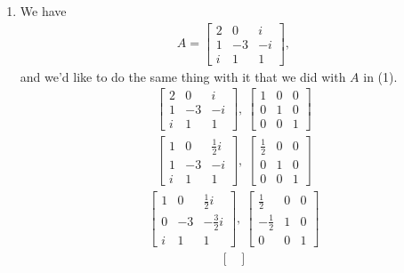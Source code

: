 \documentclass[12pt]{article}
\begin{document}
\begin{enumerate}
  \item
    We have
    \begin{align*}
      A =
      \begin{bmatrix}
        2 & 0 & i\\
        1 & -3 & -i\\
        i & 1 & 1
      \end{bmatrix},
    \end{align*}
    and we'd like to do the same thing with it that we did with
    $A$ in (1).
    \begin{align*}
      \begin{bmatrix}
        2 & 0 & i\\
        1 & -3 & -i\\
        i & 1 & 1
      \end{bmatrix},\
      \begin{bmatrix}
        1 & 0 & 0\\
        0 & 1 & 0\\
        0 & 0 & 1
      \end{bmatrix}
    \end{align*}
    \begin{align*}
      \begin{bmatrix}
        1 & 0 & \frac{1}{2}i\\
        1 & -3 & -i\\
        i & 1 & 1
      \end{bmatrix},\
      \begin{bmatrix}
        \frac{1}{2} & 0 & 0\\
        0 & 1 & 0\\
        0 & 0 & 1
      \end{bmatrix}
    \end{align*}
    \begin{align*}
      \begin{bmatrix}
        1 & 0 & \frac{1}{2}i\\
        0 & -3 & -\frac{3}{2}i\\
        i & 1 & 1
      \end{bmatrix},\
      \begin{bmatrix}
        \frac{1}{2} & 0 & 0\\
        -\frac{1}{2} & 1 & 0\\
        0 & 0 & 1
      \end{bmatrix}
    \end{align*}
    \begin{align*}
      \begin{bmatrix}

\end{bmatrix}
\end{align*}
\end{enumerate}
\end{document}
